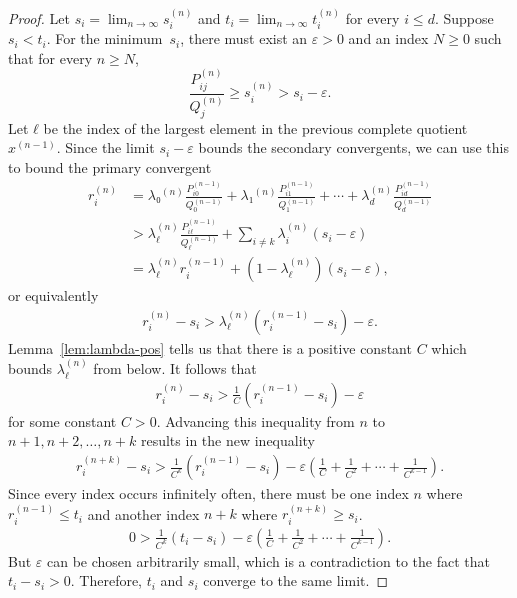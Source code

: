 \begin{proof}
  Let $s_i = \lim_{n → ∞} s_i^{(n)}$
  and $t_i = \lim_{n → ∞} t_i^{(n)}$ for every $i ≤ d$.
  Suppose $s_i < t_i$.
  For the minimum~$s_i$, there must exist an $ε > 0$ and an index $N ≥ 0$ such
  that for every $n ≥ N$,
  \[
    \frac{P_{ij}^{(n)}}{Q_j^{(n)}} ≥ s_i^{(n)} > s_i - ε.
  \]
  Let $ℓ$ be the index of the largest element in the previous complete quotient $x^{(n-1)}$.
  Since the limit $s_i - ε$ bounds the secondary convergents,
  we can use this to bound the primary convergent
  \begin{align*}
    r_i^{(n)}
    & = λ₀^{(n)} \frac{P_{i0}^{(n-1)}}{Q_0^{(n-1)}} + λ₁^{(n)} \frac{P_{i1}^{(n-1)}}{Q_1^{(n-1)}} + ⋯ + λ_d^{(n)} \frac{P_{id}^{(n-1)}}{Q_d^{(n-1)}} \\
    & > λ_{ℓ}^{(n)} \frac{P_{iℓ}^{(n-1)}}{Q_{ℓ}^{(n-1)}} + \sum_{i ≠ k} λ_i^{(n)} (s_i - ε) \\
    & = λ_{ℓ}^{(n)} r_i^{(n-1)} + (1 - λ_ℓ^{(n)}) (s_i - ε),
  \end{align*}
  or equivalently
  \begin{align*}
    r_i^{(n)} - s_i > λ_{ℓ}^{(n)} \left( r_i^{(n-1)} - s_i \right) - ε.
  \end{align*}
  Lemma~\ref{lem:lambda-pos} tells us that there is a positive constant $C$
  which bounds $λ_{ℓ}^{(n)}$ from below.
  It follows that
  \begin{align*}
    r_i^{(n)} - s_i > \frac{1}{C} \left( r_i^{(n-1)} - s_i \right) - ε
  \end{align*}
  for some constant $C > 0$.
  Advancing this inequality from $n$ to $n+1, n+2, …, n+k$ results in the new
  inequality
  \begin{align*}
    r_i^{(n+k)} - s_i > \frac{1}{C^k} \left( r_i^{(n-1)} - s_i \right) - ε\left( \frac{1}{C} + \frac{1}{C^2} + ⋯ + \frac{1}{C^{k-1}} \right).
  \end{align*}
  Since every index occurs infinitely often,
  there must be one index $n$ where $r_i^{(n-1)} ≤ t_i$
  and another index $n+k$ where $r_i^{(n+k)} ≥ s_i$.
  \begin{align*}
    0 > \frac{1}{C^k} \left( t_i - s_i \right) - ε\left( \frac{1}{C} + \frac{1}{C^2} + ⋯ + \frac{1}{C^{k-1}} \right).
  \end{align*}
  But $ε$ can be chosen arbitrarily small,
  which is a contradiction to the fact that $t_i - s_i > 0$.
  Therefore, $t_i$ and $s_i$ converge to the same limit.
\end{proof}

